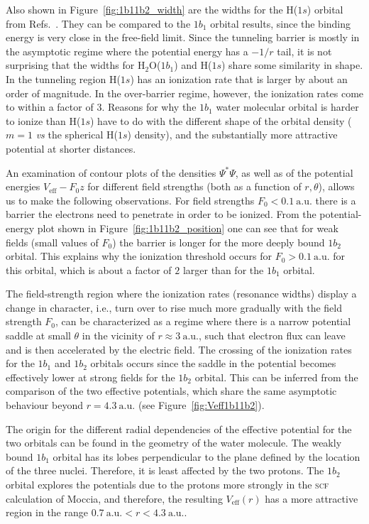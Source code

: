 Also shown in Figure~\ref{fig:1b11b2_width} are the widths for the
H($1s$) orbital from Refs.~\cite{Telnov_1989,Kolosov_1987}. They can
be compared to the $1b_{1}$ orbital results, since the binding energy
is very close in the free-field limit. Since the tunneling barrier is
mostly in the asymptotic regime where the potential energy has a
$-1/r$ tail, it is not surprising that the widths for
H$_{2}$O($1b_{1}$) and H($1s$) share some similarity in shape. In the
tunneling region H($1s$) has an ionization rate that is larger by
about an order of magnitude. In the over-barrier regime, however, the
ionization rates come to within a factor of 3. Reasons for why the
$1b_1$ water molecular orbital is harder to ionize than H($1s$) have
to do with the different shape of the orbital density ($m=1$ \emph{vs}
the spherical H($1s$) density), and the substantially more attractive
potential at shorter distances.

An examination of contour plots of the densities $\Psi^{*}\Psi$, as
well as of the potential energies $V_{\mathrm{eff}} - F_{0}z$ for
different field strengths (both as a function of $r,\theta$), allows
us to make the following observations. For field strengths $F_{0} <
0.1\ \mathrm{a.u.}$ there is a barrier the electrons need to penetrate
in order to be ionized. From the potential-energy plot shown in
Figure~\ref{fig:1b11b2_position} one can see that for weak fields
(small values of $F_{0}$) the barrier is longer for the more deeply
bound $1b_{2}$ orbital. This explains why the ionization threshold
occurs for $F_{0} > 0.1\ \mathrm{a.u.}$ for this orbital, which is
about a factor of $2$ larger than for the $1b_{1}$ orbital.

The field-strength region where the ionization rates (resonance
widths) display a change in character, i.e., turn over to rise much
more gradually with the field strength $F_{0}$, can be characterized
as a regime where there is a narrow potential saddle at small $\theta$
in the vicinity of $r \approx 3\ \mathrm{a.u.}$, such that electron
flux can leave and is then accelerated by the electric field. The
crossing of the ionization rates for the $1b_{1}$ and $1b_{2}$
orbitals occurs since the saddle in the potential becomes effectively
lower at strong fields for the $1b_{2}$ orbital. This can be inferred
from the comparison of the two effective potentials, which share the
same asymptotic behaviour beyond $r = 4.3\ \mathrm{a.u.}$ (see
Figure~\ref{fig:Veff1b11b2}).

The origin for the different radial dependencies of the effective
potential for the two orbitals can be found in the geometry of the
water molecule. The weakly bound $1b_{1}$ orbital has its lobes
perpendicular to the plane defined by the location of the three
nuclei. Therefore, it is least affected by the two protons. The
$1b_{2}$ orbital explores the potentials due to the protons more
strongly in the \textsc{scf} calculation of Moccia, and therefore, the
resulting $V_{\mathrm{eff}}(r)$ has a more attractive region in the
range $0.7\ \mathrm{a.u.} < r < 4.3\ \mathrm{a.u.}$.

